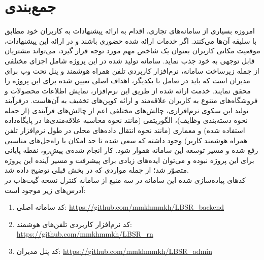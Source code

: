 \newpage

\section{جمع‌بندی}

امروزه بسیاری از سامانه‌های تجاری، اقدام به ارائه پیشنهادات به کاربران خود مطابق با سلیقه آن‌ها می‌کنند. اگر خدمات ارائه شده حضوری باشند و در ارائه این پیشنهادات، موقعیت مکانی کاربران بعنوان یک شاخص مهم مورد توجه قرار گیرد، می‌تواند مشتریان قابل توجهی به خود جذب نماید. سامانه تولید شده در این پروژه شامل اجزای مختلفی از جمله زیرساخت سامانه، نرم‌افزار کاربردی تلفن همراه هوشمند و پنل تحت وب برای مدیران است که باید در تعامل با یکدیگر، اهداف اصلی تعیین شده برای این پروژه را محقق نمایند. خدمت ارائه شده از طریق این نرم‌افزار، نمایش اطلاعات محصولات و فروشگاه‌های متنوع به کاربران علاقه‌مند و ارائه کوپن‌های تخفیف به آن‌هاست. درفرآیند تولید این سکوی نرم‌افزاری، چالش‌های مختلفی اعم از چالش‌های فرآیندی (از جمله نحوه دسته‌بندی وظایف)،‌ الگوریتمی (مانند نحوه محاسبه علاقه‌مندی‌ها در پایگاه‌داده استفاده شده) و معماری (مانند نحوه انتقال داده‌های محلی در طول نرم‌افزار تلفن همراه هوشمند کاربر) وجود داشته که سعی شده تا حد امکان با راه‌حل‌های مناسبی رفع شده و مسیر توسعه این سامانه هموار شود. کار انجام شده‌ی پیشِ‌رو، نقطه پایانی برای این پروژه نبوده و می‌توان ایده‌های زیادی برای پیشرفت و مسیر آینده این پروژه متصوّر شد؛ از جمله مواردی که در بخش قبلی توضیح داده شد.\\

کدهای پیاده‌سازی شده این سامانه در سه منبع از سامانه کنترل نسخه گیت‌هاب در آدرس‌های زیر موجود است:

\begin{enumerate}
	\item کد سامانه اصلی: \url{https://github.com/mmkhmmkh/LBSR_backend}
	\item کد نرم‌افزار کاربردی تلفن‌های هوشمند: \url{https://github.com/mmkhmmkh/LBSR_rn}
	\item کد پنل مدیران: \url{https://github.com/mmkhmmkh/LBSR_admin}
\end{enumerate}

